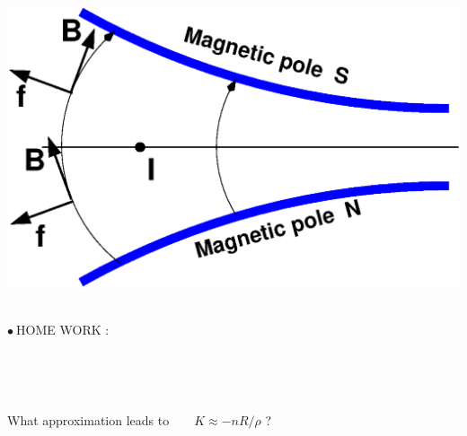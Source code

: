 \documentclass[12pt]{article}
\newcommand{\nib}{\noindent \ensuremath{\bullet~}}
\newcommand{\blue}{\color{blue}}
\begin{document}
{\begin{minipage}[b]{.19\linewidth}
\mbox{\hspace{3mm}
\includegraphics*[bbllx=0,bblly=0,bburx=300,bbury=254,width=1.1\linewidth]{./figs_FFAG_introSlides/fFoc.eps}  \hspace{5mm}
}


\end{minipage}

} %


\clearpage



{\blue 

\fontsize{30}{36} \selectfont

\nib HOME WORK  : 

~

~

What  approximation leads to  ~ ~ $ K \approx -n R/\rho$ ?

}



\clearpage 
\end{document}
